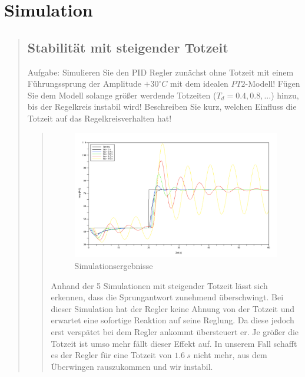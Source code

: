 \section{Simulation}
\begin{quote}
    
    
    
    \subsection{Stabilität mit steigender Totzeit}
    \begin{quote}
        
    \end{quote}
    Aufgabe:%
    Simulieren Sie den PID Regler zunächst ohne Totzeit mit einem Führungssprung der Amplitude $+30^{\circ}C$ mit dem
    idealen $PT2$-Modell! Fügen Sie dem Modell solange größer werdende Totzeiten ($T_d = 0.4, 0.8, . . .$) hinzu, bis
    der Regelkreis instabil wird! Beschreiben Sie kurz, welchen Einfluss die Totzeit auf das Regelkreisverhalten
    hat!%
    
    \begin{quote}
    
    \begin{figure}[H]
    \centering
        \includegraphics[scale=0.4, trim = 0cm 0cm 0cm 0cm, clip]{./Bilder/4_1_Simulation}
            \caption{Simulationsergebnisse}
    \end{figure}
  
        Anhand der 5 Simulationen mit steigender Totzeit lässt sich erkennen, dass die Sprungantwort zunehmend
        überschwingt. Bei dieser Simulation hat der Regler keine Ahnung von der Totzeit und erwartet eine sofortige
        Reaktion auf seine Reglung. Da diese jedoch erst verspätet bei dem Regler ankommt übersteuert er. Je größer die
        Totzeit ist umso mehr fällt dieser Effekt auf. In unserem Fall schafft es der Regler für eine Totzeit von $1.6
        \ s$ nicht mehr, aus dem Überwingen rauszukommen und wir instabil.
    


\end{quote}
\end{quote}
